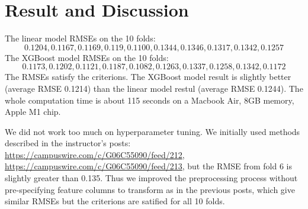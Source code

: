 \documentclass[12pt]{article}
\theoremstyle{plain}
\begin{document}
\section{Result and Discussion}
The linear model RMSEs on the 10 folds: 
\begin{equation}
0.1204, 0.1167, 0.1169, 0.119, 0.1100, 0.1344, 0.1346, 0.1317, 0.1342, 0.1257
\end{equation}
The XGBoost model RMSEs on the 10 folds: 
\begin{equation}
0.1173, 0.1202, 0.1121, 0.1187, 0.1082, 0.1263, 0.1337, 0.1258, 0.1342, 0.1172
\end{equation}
The RMSEs satisfy the criterions. The XGBoost model result is slightly better (average RMSE 0.1214) than the linear model restul (average RMSE 0.1244). The whole computation time is about 115 seconds on a Macbook Air, 8GB memory, Apple M1 chip.

We did not work too much on hyperparameter tuning. We initially used methods described in the instructor's posts: \url{https://campuswire.com/c/G06C55090/feed/212}, \url{https://campuswire.com/c/G06C55090/feed/213}, but the RMSE from fold 6 is slightly greater than 0.135. Thus we improved the preprocessing process without pre-specifying feature columns to transform as in the previous posts, which give similar RMSEs but the criterions are satified for all 10 folds.
\end{document}
